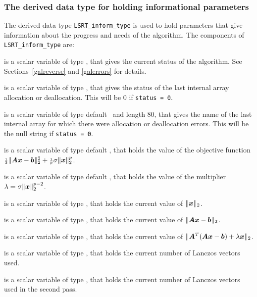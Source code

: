 \documentclass{galahad}
\newcommand{\packagename}{LS\-RT}
\begin{document}

\subsubsection{The derived data type for holding informational
 parameters}\label{typeinform}
The derived data type
{\tt \packagename\_inform\_type}
is used to hold parameters that give information about the progress and needs
of the algorithm. The components of
{\tt \packagename\_inform\_type}
are:

\begin{description}
 is a scalar variable of type \integer, that gives the
current status of the algorithm. See Sections~\ref{galreverse} and
\ref{galerrors} for details.

 is a scalar variable of type \integer,
that gives the status of the last internal array allocation
or deallocation. This will be 0 if {\tt status = 0}.

 is a scalar variable of type default \character\
and length 80, that  gives the name of the last internal array
for which there were allocation or deallocation errors.
This will be the null string if {\tt status = 0}.

 is a scalar variable of type default
\realdp, that holds the value of the objective function
${\scriptstyle \frac{1}{2}}\| {\bm{A}} {\bm{x}} - {\bm{b}}\|_2^2 + {\scriptstyle \frac{1}{p}} \sigma \| {\bm{x}} \|_2^p$.

 is a scalar variable of type default
\realdp, that holds the
value of the multiplier $\lambda = \sigma \|{\bm{x}}\|_2^{p-2}$.

 is a scalar variable of type \realdp,
that holds the current value of $\|{\bm{x}}\|_2$.

 is a scalar variable of type \realdp,
that holds the current value of $\|{\bm{A}}{\bm{x}}-{\bm{b}}\|_2$.

 is a scalar variable of type \realdp,
that holds the current value of
$\|{\bm{A}}^T ( {\bm{A}} {\bm{x}} - \bm b ) + \lambda {\bm{x}} \|_2$.

 is a scalar variable of type \integer, that holds the
current number of Lanczos vectors used.

 is a scalar variable of type \integer, that holds the
current number of Lanczos vectors used in the second pass.

\end{description}
\end{document}
